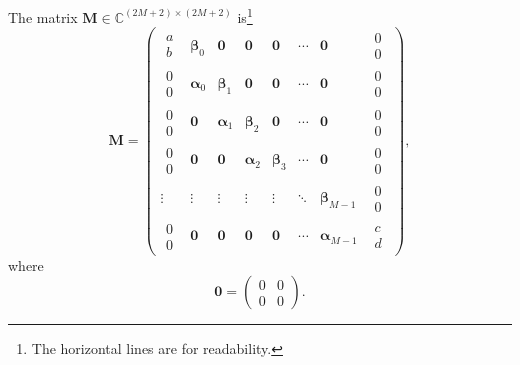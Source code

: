 \documentclass[]{article}
\begin{document}
	The matrix $\mathbf{M}\in\mathbb{C}^{(2M+2)\times(2M+2)}$ is\footnote{The horizontal lines are for readability.}
	\begin{equation}
		\mathbf{M}=
		\begin{pmatrix}
			\begin{matrix}a\\b\end{matrix}&\bm{\beta}_0&\bm{0}&\mathbf{0}&\mathbf{0}&\cdots&\mathbf{0}&\begin{matrix}0\\0\end{matrix}\\
			\hline
			\begin{matrix}0\\0\end{matrix}&\bm{\alpha}_0&\bm{\beta}_1&\mathbf{0}&\mathbf{0}&\cdots&\mathbf{0}&\begin{matrix}0\\0\end{matrix}\\
			\hline 
			\begin{matrix}0\\0\end{matrix}&\mathbf{0}&\bm{\alpha}_1&\bm{\beta}_2&\mathbf{0}&\cdots&\mathbf{0}&\begin{matrix}0\\0\end{matrix}\\
			\hline
			\begin{matrix}0\\0\end{matrix}&\mathbf{0}&\mathbf{0}&\bm{\alpha}_2&\bm{\beta}_3&\cdots&\mathbf{0}&\begin{matrix}0\\0\end{matrix}\\
			\hline
			\vdots&\vdots&\vdots&\vdots&\vdots&\ddots&\bm{\beta}_{M-1}&\begin{matrix}0\\0\end{matrix}\\
			\hline
			\begin{matrix}0\\0\end{matrix}&\mathbf{0}&\mathbf{0}&\mathbf{0}&\mathbf{0}&\cdots&\bm{\alpha}_{M-1}&\begin{matrix}c\\d\end{matrix}
		\end{pmatrix},
	\end{equation}
	where 
	\begin{equation}
		\mathbf{0}=\begin{pmatrix}0&0\\0&0\end{pmatrix}.
	\end{equation}
\end{document}
